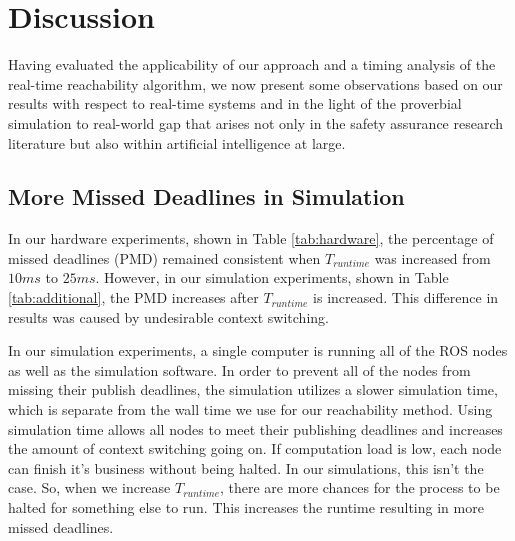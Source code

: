 \documentclass[manuscript,screen,review]{acmart}
\begin{document}
\section{Discussion}

Having evaluated the applicability of our approach and a timing analysis of the real-time reachability algorithm, we now present some observations based on our results with respect to real-time systems and in the light of the proverbial simulation to real-world gap  that arises not only in the safety assurance research literature but also within artificial intelligence at large.



\subsection{More Missed Deadlines in Simulation}

In our hardware experiments, shown in Table \ref{tab:hardware}, the percentage of missed deadlines (PMD) remained consistent when $T_{runtime}$ was increased from $10ms$ to $25ms$. However, in our simulation experiments, shown in Table \ref{tab:additional}, the PMD increases after $T_{runtime}$ is increased. This difference in results was caused by undesirable context switching. 

In our simulation experiments, a single computer is running all of the ROS nodes as well as the simulation software. In order to prevent all of the nodes from missing their publish deadlines, the simulation utilizes a slower simulation time, which is separate from the wall time we use for our reachability method. Using simulation time allows all nodes to meet their publishing deadlines and increases the amount of context switching going on. If computation load is low, each node can finish it's business without being halted. In our simulations, this isn't the case. So, when we increase $T_{runtime}$, there are more chances for the process to be halted for something else to run. This increases the runtime resulting in more missed deadlines.
\end{document}
